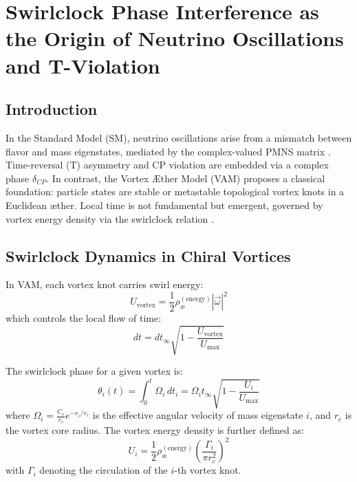 \section{Swirlclock Phase Interference as the Origin of Neutrino Oscillations and T-Violation}

\subsection{Introduction}

In the Standard Model (SM), neutrino oscillations arise from a mismatch between flavor and mass eigenstates, mediated by the complex-valued PMNS matrix \cite{pontecorvo1957inverse,mns1962neutrino}. Time-reversal (T) asymmetry and CP violation are embedded via a complex phase \( \delta_{CP} \). In contrast, the Vortex \AE ther Model (VAM) proposes a classical foundation: particle states are stable or metastable topological vortex knots in a Euclidean \ae ther. Local time is not fundamental but emergent, governed by vortex energy density via the swirlclock relation \cite{VAM2025}.

\subsection{Swirlclock Dynamics in Chiral Vortices}

In VAM, each vortex knot carries swirl energy:
\begin{equation}
U_\text{vortex} = \frac{1}{2} \rho_\text{\ae}^{(\text{energy})} |\vec{\omega}|^2
\end{equation}
which controls the local flow of time:
\begin{equation}
dt = dt_\infty \sqrt{1 - \frac{U_\text{vortex}}{U_\text{max}}}
\end{equation}

The swirlclock phase for a given vortex is:
\begin{equation}
\theta_i(t) = \int_0^t \Omega_i \, dt_i = \Omega_i t_\infty \sqrt{1 - \frac{U_i}{U_\text{max}}}
\end{equation}
where \( \Omega_i = \frac{C_e}{r_c} e^{-r_i/r_c} \) is the effective angular velocity of mass eigenstate \( i \), and \( r_c \) is the vortex core radius. The vortex energy density is further defined as:
\begin{equation}
U_i = \frac{1}{2} \rho_\text{\ae}^{(\text{energy})} \left( \frac{\Gamma_i}{\pi r_c^2} \right)^2
\end{equation}
with \( \Gamma_i \) denoting the circulation of the \( i \)-th vortex knot.

